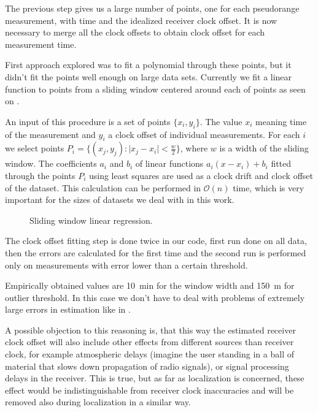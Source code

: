 The previous step gives us a large number of points, one for each pseudorange
measurement, with time and the idealized receiver clock offset.
It is now necessary to merge all the clock offsets to obtain clock offset for
each measurement time.

First approach explored was to fit a polynomial through these
points, but it didn't fit the points well enough on large data sets.
Currently we fit a linear function to points from a sliding window centered
around each of points as seen on .

An input of this procedure is a set of points \(\{x_i, y_i\}\).
The value \(x_i\) meaning time of the measurement and 
\(y_i\) a clock offset of individual measurements.
For each \(i\) we select points \(P_i = \{(x_j, y_j) : \lvert{}x_j - x_i\rvert < \frac{w}{2}\}\), where
\(w\) is a width of the sliding window.
The coefficients \(a_i\) and \(b_i\) of linear functions
\(a_i (x - x_i) + b_i\) fitted through the points \(P_i\) using least squares
are used as a clock drift and clock offset of the dataset.
This calculation can be performed in \(\mathcal{O}(n)\) time, which is very
important for the sizes of datasets we deal with in this work.


\begin{figure}[h]
	\centering
	
	\caption{Sliding window linear regression.}
	\label{fig:sliding-window-linear-regression}
\end{figure}

The clock offset fitting step is done twice in our code, first run done on
all data, then the errors are calculated for the first time and the second run
is performed only on measurements with error lower than a certain threshold.

Empirically obtained values are \SI{10}{\minute} for the window width and
\SI{150}{\meter} for outlier threshold.
In this case we don't have to deal with problems of extremely large errors in estimation
like in .

A possible objection to this reasoning is, that this way the estimated
receiver clock offset will
also include other effects from different sources than receiver clock,
for example atmospheric delays (imagine the user standing in a ball of material
that slows down propagation of radio signals), or signal processing delays
in the receiver.
This is true, but as far as localization is concerned, these effect would
be indistinguishable from receiver clock inaccuracies and will be
removed also during localization in a similar way.

